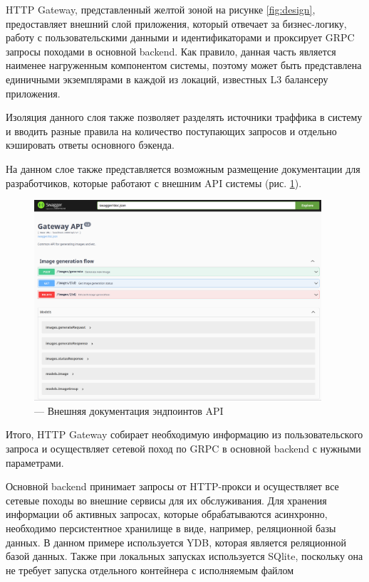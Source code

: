 HTTP Gateway, представленный желтой зоной на рисунке \ref{fig:design}, предоставляет внешний слой приложения, который отвечает за бизнес-логику,
работу с пользовательскими данными и идентификаторами и проксирует GRPC запросы походами в основной backend.
Как правило, данная часть является наименее нагруженным компонентом системы, поэтому может быть 
представлена единичными экземплярами в каждой из локаций, известных L3 балансеру приложения.

Изоляция данного слоя также позволяет разделять источники траффика в систему и вводить разные
правила на количество поступающих запросов и отдельно кэшировать ответы основного бэкенда.

На данном слое также представляется возможным размещение документации для разработчиков, которые работают
с внешним API системы (рис. \ref{fig:swag}).

\begin{footnotesize}
\begin{figure}[H]
  \centering
  \includegraphics[width=0.95\textwidth]{img/swag.png}
  \caption{--- Внешняя документация эндпоинтов API}
    \label{fig:swag}
\end{figure}
\end{footnotesize}

Итого, HTTP Gateway собирает необходимую информацию из пользовательского запроса и осуществляет сетевой
поход по GRPC в основной backend с нужными параметрами.

Основной backend принимает запросы от HTTP-прокси и осуществляет все сетевые походы во внешние сервисы для
их обслуживания. Для хранения информации об активных запросах, которые обрабатываются асинхронно, необходимо персистентное 
хранилище в виде, например, реляционной базы данных. В данном примере используется YDB, которая является реляционной базой данных.
Также при локальных запусках используется SQlite, поскольку она не требует запуска отдельного контейнера
с исполняемым файлом

